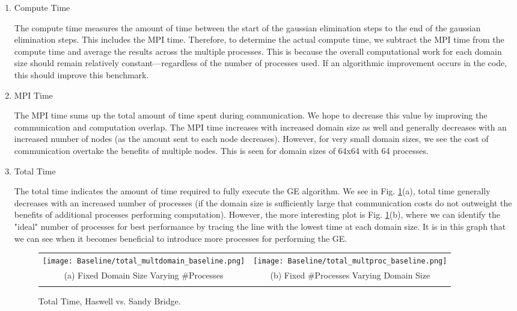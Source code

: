 \begin{enumerate}
\begin{enumerate}
	\item Compute Time
	
	The compute time measures the amount of time between the start of the gaussian elimination steps to the end of the gaussian elimination steps. This includes the MPI time. Therefore, to determine the actual compute time, we subtract the MPI time from the compute time and average the results across the multiple processes. This is because the overall computational work for each domain size should remain relatively constant---regardless of the number of processes used. If an algorithmic improvement occurs in the code, this should improve this benchmark.
	
	\item MPI Time
	
	The MPI time sums up the total amount of time spent during communication. We hope to decrease this value by improving the communication and computation overlap. The MPI time increases with increased domain size as well and generally decreases with an increased number of nodes (as the amount sent to each node decreases). However, for very small domain sizes, we see the cost of communication overtake the benefits of multiple nodes. This is seen for domain sizes of 64x64 with 64 processes.
	
	\item Total Time
	
	The total time indicates the amount of time required to fully execute the GE algorithm. We see in Fig. \ref{fig:total}(a), total time generally decreases with an increased number of processes (if the domain size is sufficiently large that communication costs do not outweight the benefits of additional processes performing computation). However, the more interesting plot is Fig. \ref{fig:total}(b), where we can identify the "ideal" number of processes for best performance by tracing the line with the lowest time at each domain size. It is in this graph that we can see when it becomes beneficial to introduce more processes for performing the GE.
 	
 	
 	\begin{figure}[h] %
		\hspace*{-0.25\linewidth}\begin{tabular}{cc}
			\texttt{[image: Baseline/total\_multdomain\_baseline.png]} & \texttt{[image: Baseline/total\_multproc\_baseline.png]} \\
		    (a) Fixed Domain Size Varying \#Processes & (b) Fixed \#Processes Varying Domain Size\\[6pt]\\
		\end{tabular}
		\caption{Total Time, Haswell vs. Sandy Bridge.}
		\label{fig:total}
	\end{figure}
	\end{enumerate}


\end{enumerate}
